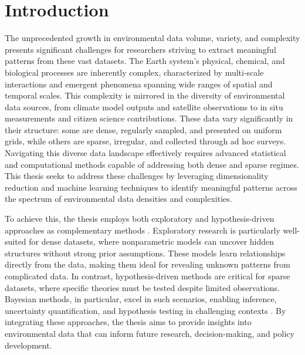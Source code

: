 
\ifpdf
    \graphicspath{{content/chapter2/figs/raster/}{content/chapter2/figs/pdf/}{content/chapter2/figs/}}
\else
    \graphicspath{{content/chapter2/figs/vector/}{content/chapter2/figs/}}
\fi

\chapter{Introduction}\label{chapter:intro}


The unprecedented growth in environmental data volume, variety, and complexity presents significant challenges for researchers striving to extract meaningful patterns from these vast datasets. The Earth system's physical, chemical, and biological processes are inherently complex, characterized by multi-scale interactions and emergent phenomena spanning wide ranges of spatial and temporal scales. This complexity is mirrored in the diversity of environmental data sources, from climate model outputs and satellite observations to in situ measurements and citizen science contributions. These data vary significantly in their structure: some are dense, regularly sampled, and presented on uniform grids, while others are sparse, irregular, and collected through ad hoc surveys. Navigating this diverse data landscape effectively requires advanced statistical and computational methods capable of addressing both dense and sparse regimes. This thesis seeks to address these challenges by leveraging dimensionality reduction and machine learning techniques to identify meaningful patterns across the spectrum of environmental data densities and complexities.

To achieve this, the thesis employs both exploratory and hypothesis-driven approaches as complementary methods \cite[e.g.][]{kell_here_2004}. Exploratory research is particularly well-suited for dense datasets, where nonparametric models can uncover hidden structures without strong prior assumptions. These models learn relationships directly from the data, making them ideal for revealing unknown patterns from complicated data. In contrast, hypothesis-driven methods are critical for sparse datasets, where specific theories must be tested despite limited observations. Bayesian methods, in particular, excel in such scenarios, enabling inference, uncertainty quantification, and hypothesis testing in challenging contexts \cite[e.g.][]{datta_nonseparable_2016}. By integrating these approaches, the thesis aims to provide insights into environmental data that can inform future research, decision-making, and policy development.

